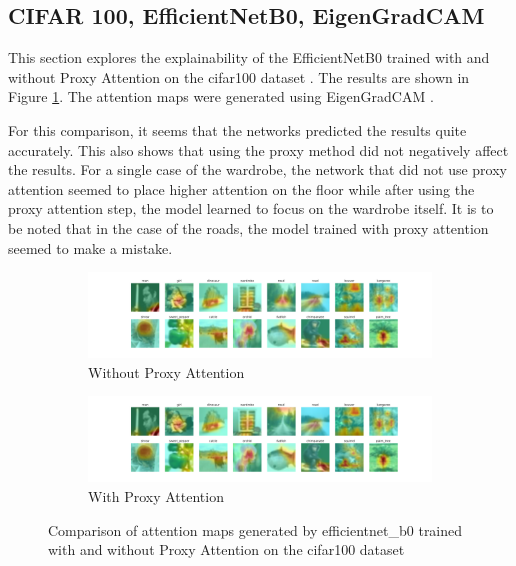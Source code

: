 \documentclass[a4paper,11pt,openright]{book}
\begin{document}
\subsection{CIFAR 100, EfficientNetB0, EigenGradCAM}
This section explores the explainability of the EfficientNetB0 \cite{tanEfficientnetRethinkingModel2019} trained with and without Proxy Attention on the cifar100 dataset \cite{krizhevskyLearningMultipleLayers}. The results are shown in Figure \ref{fig:efficientnet_b0_cifar100}. The attention maps were generated using EigenGradCAM \cite{banymuhammadEigenCAMVisualExplanations2021}.

For this comparison, it seems that the networks predicted the results quite accurately. This also shows that using the proxy method did not negatively affect the results. For a single case of the wardrobe, the network that did not use proxy attention seemed to place higher attention on the floor while after using the proxy attention step, the model learned to focus on the wardrobe itself. It is to be noted that in the case of the roads, the model trained with proxy attention seemed to make a mistake.

\begin{figure}[!htb]
    \begin{subfigure}[b]{1\textwidth}
        \includegraphics[width=\linewidth]{images/cifar100_efficientnet_b0_noproxy_0.pdf}
        \caption{Without Proxy Attention}
    \end{subfigure}
    \begin{subfigure}[b]{1\textwidth}
        \includegraphics[width=\linewidth]{images/cifar100_efficientnet_b0_proxy_0.pdf}
        \caption{With Proxy Attention}
    \end{subfigure}

    \caption{Comparison of attention maps generated by efficientnet\_b0 trained with and without Proxy Attention on the cifar100 dataset}
    \label{fig:efficientnet_b0_cifar100}
\end{figure}
    
\end{document}
